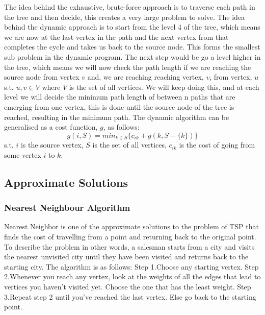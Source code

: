 \documentclass[11pt]{article}
\begin{document}
The idea behind the exhaustive, brute-force approach is to traverse each path in the tree and then decide, this creates a very large problem to solve. The idea behind the dynamic approach is to start from the level 4 of the tree, which means we are now at the last vertex in the path and the next vertex from that completes the cycle and takes us back to the source node. This forms the smallest sub problem in the dynamic program. The next step would be go a level higher in the tree, which means we will now check the path length if we are reaching the source node from vertex $v$ and, we are reaching reaching vertex, $v$, from vertex, $u$ s.t. $u,v \in V$ where $V$ is the set of all vertices. We will keep doing this, and at each level we will decide the minimum path length of between n paths that are emerging from one vertex, this is done until the source node of the tree is reached, resulting in the minimum path. The dynamic algorithm can be generalised as a cost function, $g$, as follows:
$$g(i, S) = min_{k\in S} \bigg\{c_{ik} + g(k, S-\{k\})\bigg\}$$
s.t. $i$ is the source vertex, $S$ is the set of all vertices, $c_{ik}$ is the cost of going from some vertex $i$ to $k$. 
	

		
		
		
	\subsection{ Approximate Solutions}
		\subsubsection {Nearest Neighbour Algorithm}
		Nearest Neighbor is one of the approximate solutions to the problem of TSP that finds the cost of travelling from a point and returning back to the original point. To describe the problem in other words, a salesman starts from a city and visits the nearest unvisited city until they have been visited and returns back to the starting city. \newline \newline
		The algorithm is as follows: \newline
		Step 1.Choose any starting vertex. \newline
        Step 2.Whenever you reach any vertex, look at the weights of all the edges that lead to vertices you haven’t visited yet. Choose the one that has the least weight. \newline
        Step 3.Repeat step 2 until you’ve reached the last vertex. Else go back to the starting point.
\end{document}
